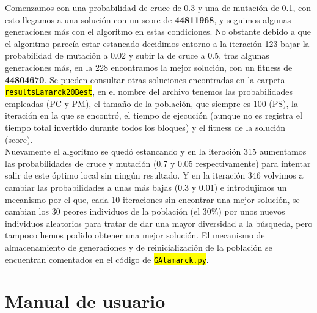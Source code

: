 \documentclass[10pt,a4paper]{article}
\newcommand{\archive}[1]{\sethlcolor{light-green}\hl{\texttt{#1}}} %
\begin{document}
Comenzamos con una probabilidad de cruce de 0.3 y una de mutación de 0.1, con esto llegamos a una solución con un score de \textbf{44811968}, y seguimos algunas generaciones más con el algoritmo en estas condiciones. No obstante debido a que el algoritmo parecía estar estancado decidimos entorno a la iteración 123 bajar la probabilidad de mutación a 0.02 y subir la de cruce a 0.5, tras algunas generaciones más, en la 228 encontramos la mejor solución, con un fitness de \textbf{44804670}. Se pueden consultar otras soluciones encontradas en la carpeta \archive{resultsLamarck20Best}, en el nombre del archivo tenemos las probabilidades empleadas (PC y PM), el tamaño de la población, que siempre es 100 (PS), la iteración en la que se encontró, el tiempo de ejecución (aunque no es registra el tiempo total invertido durante todos los bloques) y el fitness de la solución (score).\\

Nuevamente el algoritmo se quedó estancando y en la iteración 315 aumentamos las probabilidades de cruce y mutación (0.7 y 0.05 respectivamente) para intentar salir de este óptimo local sin ningún resultado. Y en la iteración 346 volvimos a cambiar las probabilidades a unas más bajas (0.3 y 0.01) e introdujimos un mecanismo por el que, cada 10 iteraciones sin encontrar una mejor solución, se cambian los 30 peores individuos de la población (el 30\%) por unos nuevos individuos aleatorios para tratar de dar una mayor diversidad a la búsqueda, pero tampoco hemos podido obtener una mejor solución. El mecanismo de almacenamiento de generaciones y de reinicialización de la población se encuentran comentados en el código de \archive{GAlamarck.py}.

\section{Manual de usuario}
\end{document}
